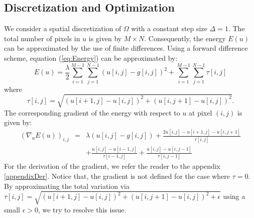 \documentclass{paper}
\begin{document}
\subsection{Discretization and Optimization}
We consider a spatial discretization of \begin{math}\Omega\end{math} with a constant step size \begin{math}\Delta=1\end{math}. The total number of pixels in \begin{math}u\end{math} is given by \begin{math}M\times N\end{math}. Consequently, the energy \begin{math}E(u)\end{math} can be approximated by the use of finite differences. Using a forward difference scheme, equation (\ref{eq:Energy}) can be approximated by:
\begin{equation}
E(u) = \frac{\lambda}{2}\sum_{i=1}^{M-1}\sum_{j=1}^{N-1}(u[i,j]-g[i,j])^{2} + \sum_{i=1}^{M-1}\sum_{j=1}^{N-1}\tau[i,j]
\end{equation}
where
\begin{equation}
\tau[i,j]=\sqrt{(u[i+1,j]-u[i,j])^2+(u[i,j+1]-u[i,j])^2}.
\label{eq:tau}
\end{equation}
The corresponding gradient of the energy with respect to \begin{math}u\end{math} at pixel \begin{math}(i,j)\end{math} is given by:
\begin{eqnarray}
(\nabla_{u}E(u))_{i,j} &=& \lambda(u[i,j]-g[i,j]) + \frac{2u[i,j]-u[i+1,j]-u[i,j+1]}{\tau[i,j]} \nonumber \\
   && + \frac{u[i,j]-u[i-1,j]}{\tau[i-1,j]} + \frac{u[i,j]-u[i,j-1]}{\tau[i,j-1]}
\label{eq:delEnergy}
\end{eqnarray}
For the derivation of the gradient, we refer the reader to the appendix \ref{appendixDer}. Notice that, the gradient is not defined for the case where \begin{math}\tau=0\end{math}. By approximating the total variation via \begin{math}\tau[i,j]=\sqrt{(u[i+1,j]-u[i,j])^2+(u[i,j+1]-u[i,j])^2+\epsilon}\end{math} using a small \begin{math}\epsilon>0\end{math}, we try to resolve this issue.
\end{document}
